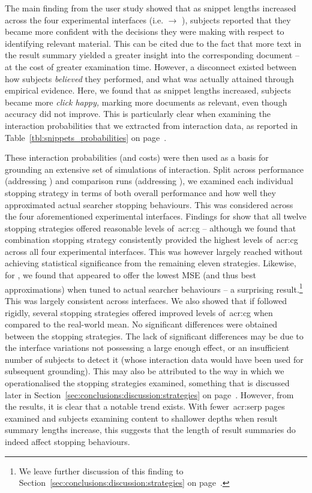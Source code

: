 The main finding from the user study showed that as snippet lengths increased across the four experimental interfaces (i.e.  $\rightarrow$ ), subjects reported that they became more confident with the decisions they were making with respect to identifying relevant material. This can be cited due to the fact that more text in the result summary yielded a greater insight into the corresponding document -- at the cost of greater examination time. However, a disconnect existed between how subjects \emph{believed} they performed, and what was actually attained through empirical evidence. Here, we found that as snippet lengths increased, subjects became more \emph{click happy,} marking more documents as relevant, even though accuracy did not improve. This is particularly clear when examining the interaction probabilities that we extracted from interaction data, as reported in Table~\ref{tbl:snippets_probabilities} on page~\pageref{tbl:snippets_probabilities}.

These interaction probabilities (and costs) were then used as a basis for grounding an extensive set of simulations of interaction. Split across performance (addressing ) and comparison runs (addressing ), we examined each individual stopping strategy in terms of both overall performance and how well they approximated actual searcher stopping behaviours. This was considered across the four aforementioned experimental interfaces. Findings for  show that all twelve stopping strategies offered reasonable levels of~\gls{acr:cg} -- although we found that combination stopping strategy  consistently provided the highest levels of~\gls{acr:cg} across all four experimental interfaces. This was however largely reached without achieving statistical significance from the remaining eleven strategies. Likewise, for , we found that  appeared to offer the lowest MSE (and thus best approximations) when tuned to actual searcher behaviours -- a surprising result.\footnote{We leave further discussion of this finding to Section~\ref{sec:conclusions:discussion:strategies} on page~\pageref{sec:conclusions:discussion:strategies}.} This was largely consistent across interfaces. We also showed that if followed rigidly, several stopping strategies offered improved levels of~\gls{acr:cg} when compared to the real-world mean. No significant differences were obtained between the stopping strategies. The lack of significant differences may be due to the interface variations not possessing a large enough effect, or an insufficient number of subjects to detect it (whose interaction data would have been used for subsequent grounding). This may also be attributed to the way in which we operationalised the stopping strategies examined, something that is discussed later in Section~\ref{sec:conclusions:discussion:strategies} on page~\pageref{sec:conclusions:discussion:strategies}. However, from the results, it is clear that a notable trend exists. With fewer~\gls{acr:serp} pages examined and subjects examining content to shallower depths when result summary lengths increase, this suggests that the length of result summaries do indeed affect stopping behaviours.

